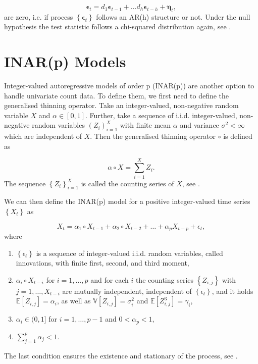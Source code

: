 \begin{equation}
\bm{\epsilon}_t = d_1\bm{\epsilon}_{t-1} +\ldots d_h \bm{\epsilon}_{t-h} + \bm{\eta}_t,
\label{eq:Breusch-Godfrey Test model}
\end{equation}
%
are zero, i.e. if process $\left\{\bm{\epsilon}_t\right\}$ follows an AR(h) structure or not. Under the null hypothesis the test statistic follows a chi-squared distribution again, see \textcite{Lütkepohl:2007}. 

\section{INAR(p) Models}
\label{sec: Inar Models}

Integer-valued autoregressive models of order p (INAR(p)) are another option to handle univariate count data. To define them, we first need to define the generalised thinning operator. Take an integer-valued, non-negative random variable $X$ and $\alpha \in [0,1]$. Further, take a sequence of i.i.d. integer-valued, non-negative random variables $(Z_i)_{i=1}^X$ with finite mean $\alpha$ and variance $\sigma^2<\infty $ which are independent of $X$. Then the generalised thinning operator $\circ$ is defined as

\begin{equation}
\alpha \circ X = \sum_{i=1}^X Z_i .
\label{eq:Thinning operator}
\end{equation}
%
The sequence  $\left\{Z_i \right\}_{i=1}^X$ is called the counting series of $X$, see \textcite{Silva:2005}. 

We can then define the INAR(p) model for a positive integer-valued time series $\left\{X_t \right\}$ as

\begin{equation}
X_t = \alpha_1 \circ X_{t-1} + \alpha_2 \circ X_{t-2} + \ldots + \alpha_p X_{t-p} +\epsilon_t ,
\label{eq:Inar(p) model}
\end{equation}
%
where

\begin{enumerate}
	\item $\left\{\epsilon_t\right\}$ is a sequence of integer-valued i.i.d. random variables, called innovations, with finite first, second, and third moment, 
	\item $\alpha_i \circ X_{t-i}$ for $i= 1,\ldots,p$ and for each $i$ the counting series $\left\{Z_{i,j}\right\}$ with $j=1,\ldots,X_{t-i}$ are mutually independent, independent of $\left\{\epsilon_t\right\}$, and it holds $\mathbb{E}[Z_{i,j}]=\alpha_i$, as well as $\mathbb{V}[Z_{i,j}] = \sigma_i^2$ and $\mathbb{E}[Z_{i,j}^3] = \gamma_i$,
	\item $\alpha_i \in (0,1]$ for $i=1,\ldots,p-1$ and $0 < \alpha_p < 1$,
	\item $\sum_{j=1}^p \alpha_j < 1$.
\end{enumerate}
%
The last condition ensures the existence and stationary of the process, see \textcite{Silva:2005}. 

